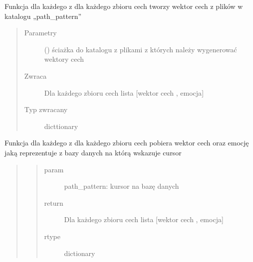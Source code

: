 \documentclass[letterpaper,10pt,polish]{sphinxmanual}
\begin{document}
\begin{fulllineitems}
\label{\detokenize{knn_main:knn_main.knn_get_training_feature_set_from_db}}
Funkcja dla każdego z dla każdego zbioru cech tworzy wektor cech z plików w katalogu „path\_pattern”
\begin{quote}\begin{description}
\item[{Parametry}] \leavevmode
{} () \textendash{} ściażka do katalogu z plikami z których należy wygenerować wektory cech

\item[{Zwraca}] \leavevmode
Dla każdego zbioru cech lista {[}wektor cech , emocja{]}

\item[{Typ zwracany}] \leavevmode
dicttionary

\end{description}\end{quote}

\end{fulllineitems}


\begin{fulllineitems}
\label{\detokenize{knn_main:knn_main.knn_get_training_feature_set_from_dir}}
Funkcja dla każdego z dla każdego zbioru cech pobiera wektor cech oraz emocję jaką reprezentuje
z bazy danych na którą wskazuje cursor
\begin{quote}
\begin{quote}\begin{description}
\item[{param}] \leavevmode
path\_pattern: kursor na bazę danych

\item[{return}] \leavevmode
Dla każdego zbioru cech lista {[}wektor cech , emocja{]}

\item[{rtype}] \leavevmode
dictionary

\end{description}\end{quote}
\end{quote}

\end{fulllineitems}
\end{document}
